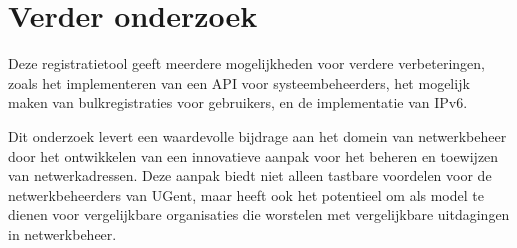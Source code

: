 \section{Verder onderzoek}
Deze registratietool geeft meerdere mogelijkheden voor verdere verbeteringen, zoals het implementeren van een API voor systeembeheerders, het mogelijk maken van bulkregistraties voor gebruikers, en de implementatie van IPv6.

Dit onderzoek levert een waardevolle bijdrage aan het domein van netwerkbeheer door het ontwikkelen van een innovatieve aanpak voor het beheren en toewijzen van netwerkadressen. Deze aanpak biedt niet alleen tastbare voordelen voor de netwerkbeheerders van UGent, maar heeft ook het potentieel om als model te dienen voor vergelijkbare organisaties die worstelen met vergelijkbare uitdagingen in netwerkbeheer.


